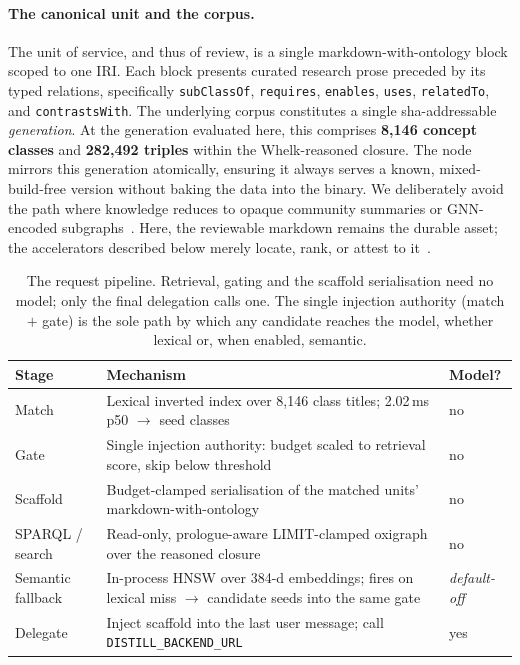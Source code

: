 \documentclass[10pt,twocolumn]{article}
\begin{document}
\paragraph{The canonical unit and the corpus.} The unit of service, and thus of review, is a single markdown-with-ontology block scoped to one IRI. Each block presents curated research prose preceded by its typed relations, specifically \texttt{subClassOf}, \texttt{requires}, \texttt{enables}, \texttt{uses}, \texttt{relatedTo}, and \texttt{contrastsWith}. The underlying corpus constitutes a single sha-addressable \emph{generation}. At the generation evaluated here, this comprises \textbf{8{,}146 concept classes} and \textbf{282{,}492 triples} within the Whelk-reasoned closure. The node mirrors this generation atomically, ensuring it always serves a known, mixed-build-free version without baking the data into the binary. We deliberately avoid the path where knowledge reduces to opaque community summaries or GNN-encoded subgraphs~\cite{edge2024graphrag,he2024gretriever}. Here, the reviewable markdown remains the durable asset; the accelerators described below merely locate, rank, or attest to it~\cite{garcez2023neurosymbolic}.

\begin{table}[t]\centering\small
\caption{The request pipeline. Retrieval, gating and the scaffold serialisation need no model; only
the final delegation calls one. The single injection authority (match $+$ gate) is the sole path by
which any candidate reaches the model, whether lexical or, when enabled, semantic.}
\label{tab:pipeline}
\renewcommand{\arraystretch}{1.15}
\begin{tabularx}{\textwidth}{@{}>{\raggedright\arraybackslash}p{2.7cm} >{\raggedright\arraybackslash}X >{\centering\arraybackslash}p{2.2cm}@{}}
\toprule
Stage & Mechanism & Model? \\
\midrule
Match & Lexical inverted index over 8{,}146 class titles; 2.02\,ms p50 $\to$ seed classes & no \\
Gate & Single injection authority: budget scaled to retrieval score, skip below threshold & no \\
Scaffold & Budget-clamped serialisation of the matched units' markdown-with-ontology & no \\
SPARQL / search & Read-only, prologue-aware LIMIT-clamped oxigraph over the reasoned closure & no \\
Semantic fallback & In-process HNSW over 384-d embeddings; fires on lexical miss $\to$ candidate seeds into the same gate & \emph{default-off} \\
Delegate & Inject scaffold into the last user message; call \texttt{DISTILL\_BACKEND\_URL} & yes \\
\bottomrule
\end{tabularx}
\end{table}
\end{document}
